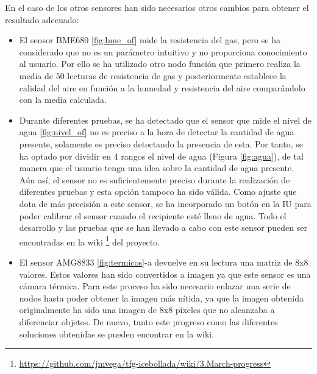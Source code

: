 En el caso de los otros sensores han sido necesarios otros cambios para obtener el resultado adecuado:
\begin{itemize}
	\item El sensor BME680 \ref{fig:bme_of} mide la resistencia del gas, pero se ha considerado que no es un parámetro intuitivo y no proporciona conocimiento al usuario. Por ello se ha utilizado otro nodo función que primero realiza la media de 50 lecturas de resistencia de gas y posteriormente establece la calidad del aire en función a la humedad y resistencia del aire comparándolo con la media calculada.
	
	\item Durante diferentes pruebas, se ha detectado que el sensor que mide el nivel de agua \ref{fig:nivel_of} no es preciso a la hora de detectar la cantidad de agua presente, solamente es preciso detectando la presencia de esta. Por tanto, se ha optado por dividir en 4 rangos el nivel de agua (Figura \ref{fig:agua}), de tal manera que el usuario tenga una idea sobre la cantidad de agua presente. Aún así, el sensor no es suficientemente preciso durante la realización de diferentes pruebas y esta opción tampoco ha sido válida. Como ajuste que dota de más precisión a este sensor, se ha incorporado un botón en la IU para poder calibrar el sensor cuando el recipiente esté lleno de agua. Todo el desarrollo y las pruebas que se han llevado a cabo con este sensor pueden ser encontradas en la wiki \footnote{\url{https://github.com/jmvega/tfg-icebollada/wiki/3.March-progress}} del proyecto.
	
	\item El sensor AMG8833 \ref{fig:termicos}-a devuelve en su lectura una matriz de 8x8 valores. Estos valores han sido convertidos a imagen ya que este sensor es una cámara térmica. Para este proceso ha sido necesario enlazar una serie de nodos hasta poder obtener la imagen más nítida, ya que la imagen obtenida originalmente ha sido una imagen de 8x8 píxeles que no alcanzaba a diferenciar objetos. De nuevo, tanto este progreso como las diferentes soluciones obtenidas se pueden encontrar en la wiki. 
\end{itemize}
